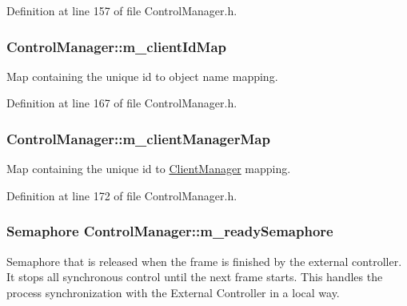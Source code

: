 Definition at line 157 of file Control\-Manager.\-h.

\hypertarget{class_control_manager_a5623f6ef4da21d143a7a6cf5fbee136f}{
\subsubsection[{m\-\_\-client\-Id\-Map}]{ Control\-Manager\-::m\-\_\-client\-Id\-Map\hspace{0.3cm}{\ttfamily [private]}}}\label{class_control_manager_a5623f6ef4da21d143a7a6cf5fbee136f}
Map containing the unique id to object name mapping. 

Definition at line 167 of file Control\-Manager.\-h.

\hypertarget{class_control_manager_af47dee5a077190c6aeb7b9ef3d9cfb3b}{
\subsubsection[{m\-\_\-client\-Manager\-Map}]{ Control\-Manager\-::m\-\_\-client\-Manager\-Map\hspace{0.3cm}{\ttfamily [private]}}}\label{class_control_manager_af47dee5a077190c6aeb7b9ef3d9cfb3b}
Map containing the unique id to \hyperlink{class_client_manager}{Client\-Manager} mapping. 

Definition at line 172 of file Control\-Manager.\-h.

\hypertarget{class_control_manager_ab718d2d17750dfea91411de871855075}{
\subsubsection[{m\-\_\-ready\-Semaphore}]{\setlength{\rightskip}{0pt plus 5cm}Semaphore Control\-Manager\-::m\-\_\-ready\-Semaphore\hspace{0.3cm}{\ttfamily [private]}}}\label{class_control_manager_ab718d2d17750dfea91411de871855075}
Semaphore that is released when the frame is finished by the external controller. It stops all synchronous control until the next frame starts. This handles the process synchronization with the External Controller in a local way. 

